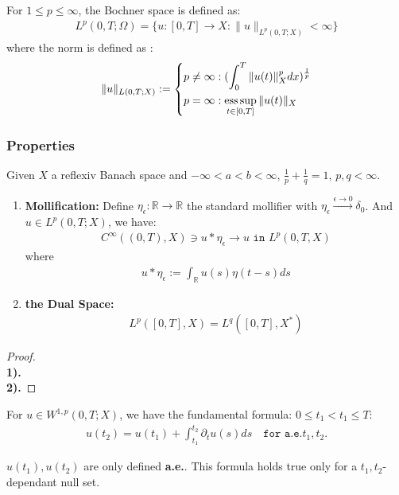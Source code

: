 \begin{definition}
For $1 \leq p \leq \infty$, the Bochner space is defined as:
\begin{align*}
	L^p(0, T; \Omega) = \{ u: [0, T]\rightarrow X : \|u\|_{L^p(0, T;X)} < \infty \}
\end{align*}
where the norm is defined as :
\begin{equation}
\|u\|_{L(0, T;X)}:=
\left\{
\begin{aligned}
	p &\neq \infty: (\int_0^T \|u(t)\|_X^p dx)^\frac{1}{p}\\
	p &= \infty : \operatorname*{ess\,sup}_{t \in [0, T]} \|u(t)\|_X
\end{aligned}
\right.	
\end{equation}
\end{definition}


\subsubsection{Properties}
\begin{theorem}
	Given $X$ a reflexiv Banach space and $-\infty < a < b < \infty$, $\frac{1}{p} + \frac{1}{q} = 1$, $p, q < \infty$. 
	\begin{enumerate}
		\item \textbf{Mollification:} Define $\eta_\epsilon: \mathbb{R} \rightarrow \mathbb{R}$ the standard mollifier with $\eta_\epsilon \overset{\epsilon \rightarrow 0}{\rightarrow} \delta_0$. And $u \in L^p(0, T; X)$, we have:
		\begin{align*}
			C^\infty((0, T), X) \ni u * \eta_\epsilon \longrightarrow u \texttt{ in } L^p(0, T, X)
		\end{align*}
		where
		\begin{align*}
			u* \eta_\epsilon := \int_\mathbb{R} u(s) \eta( t - s ) ds
		\end{align*}
		\item \textbf{the Dual Space:}
		\begin{align*}
			L^p([0, T], X) = L^q([0, T], X^*)
		\end{align*}
	\end{enumerate}
\end{theorem}
\begin{proof}
	\quad\\
	\textbf{1).}\\
	\textbf{2).} 
\end{proof}

\begin{lemma}
	For $u \in W^{1, p}(0, T; X)$, we have the fundamental formula: $ 0\le t_1 < t_1 \le T:$
	\begin{align*}
		u(t_2) = u(t_1) + \int_{t_1}^{t_2} \partial_t u(s) ds\quad \texttt{for a.e.}t_1, t_2. 
	\end{align*}
\end{lemma}
\begin{remark}
$u(t_1), u(t_2)$ are only defined \textbf{a.e.}.	 This formula holds true only for a $t_1, t_2$-dependant null set.
\end{remark}


